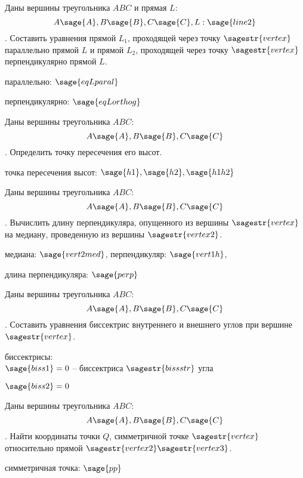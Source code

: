 \begin{question}
Даны вершины треугольника $ABC$ и прямая $L$: \[A\sage{A}, B\sage{B}, C\sage{C}, L: \sage{line2}\].
Составить уравнения прямой $L_1$, проходящей через точку $\sagestr{vertex}$ параллельно прямой $L$ и прямой $L_2$, проходящей через точку $\sagestr{vertex}$ перпендикулярно прямой $L$. 
\end{question}
\begin{solution}
параллельно: \ensuremath{\displaystyle{\sage{eqLparal}}}

перпендикулярно: \ensuremath{\displaystyle{\sage{eqLorthog}}}
\end{solution}

\begin{question}
Даны вершины треугольника $ABC$: \[A\sage{A}, B\sage{B}, C\sage{C}\].
Определить точку пересечения его высот.
\end{question}
\begin{solution}
точка пересечения высот: \ensuremath{\displaystyle{\sage{h1}, \sage{h2}, \sage{h1h2}}}
\end{solution}

\begin{question}
Даны вершины треугольника $ABC$: \[A\sage{A}, B\sage{B}, C\sage{C}\].
Вычислить длину перпендикуляра, опущенного из вершины $\sagestr{vertex}$ на медиану, проведенную из вершины $\sagestr{vertex2}$.
\end{question}
\begin{solution}
медиана: \ensuremath{\displaystyle{\sage{vert2med}}}, перпендикуляр: \ensuremath{\displaystyle{\sage{vert1h}}},

длина перпендикуляра: \ensuremath{\displaystyle{\sage{perp}}}
\end{solution}

\begin{question}
Даны вершины треугольника $ABC$: \[A\sage{A}, B\sage{B}, C\sage{C}\].
Составить уравнения биссектрис внутреннего и внешнего углов при вершине $\sagestr{vertex}$.
\end{question}
\begin{solution}
биссектрисы: \\ 
\ensuremath{\displaystyle{\sage{biss1}=0}} -- биссектриса $\sagestr{bissstr}$ угла

\ensuremath{\displaystyle{\sage{biss2}=0}}
\end{solution}

\begin{question}
Даны вершины треугольника $ABC$: \[A\sage{A}, B\sage{B}, C\sage{C}\].
Найти координаты точки $Q$, симметричной точке $\sagestr{vertex}$  относительно прямой $\sagestr{vertex2}\sagestr{vertex3}$.
\end{question}
\begin{solution}
симметричная точка: \ensuremath{\displaystyle{\sage{pp}}}
\end{solution}